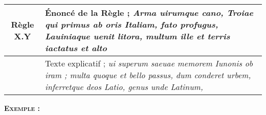 \medskip

\begin{center}
\begin{tabular}{|c p{12.5cm}|}
\hline
\rowcolor{red!10}\textbf{Règle X.Y} & Énoncé de la Règle ; \textsl{Arma uirumque cano, Troiae qui primus ab oris Italiam, fato profugus, Lauiniaque uenit litora, multum ille et terris iactatus et alto} \\ \hline
 & Texte explicatif ; \textit{ui superum saeuae memorem Iunonis ob iram ; multa quoque et bello passus, dum conderet urbem, inferretque deos Latio, genus unde Latinum,} \\ \hline
\hline
\end{tabular}
\end{center}

\medskip

\begin{large}
\textbf{\textsc{Exemple :}}
\end{large}
\medskip


\bigskip

\pagebreak